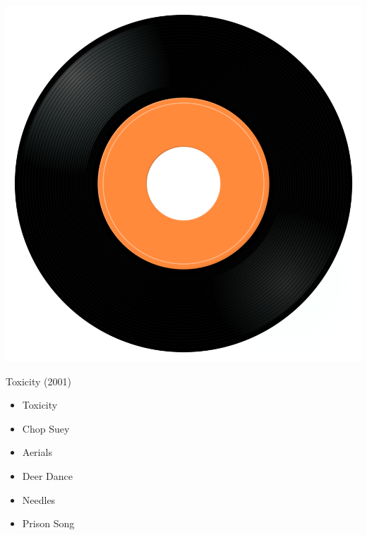\begin{minipage}[t]{0.25\textwidth}
\captionsetup{type=figure}
\includegraphics[width=\textwidth]{Images/cover.png}
\caption*{Toxicity (2001)}
\end{minipage}
\begin{minipage}[t]{0.25\textwidth}\vspace{0pt}
\begin{itemize}[nosep,leftmargin=1em,labelwidth=*,align=left]
	\setlength{\itemsep}{0pt}
	\item Toxicity
	\item Chop Suey
	\item Aerials
	\item Deer Dance
	\item Needles
	\item Prison Song
\end{itemize}
\end{minipage}
